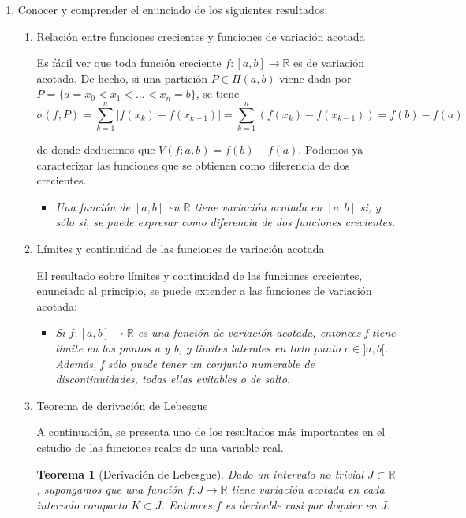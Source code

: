 \documentclass[a4paper, 12pt]{article}
\newtheorem{teorema}{Teorema}
\begin{document}
\begin{enumerate}[label=\textbf{\arabic*}.]
	\bigskip
	
	\item Conocer y comprender el enunciado de los siguientes resultados:
	
	\begin{enumerate}[label=\textit{\alph*)}]
		\item Relación entre funciones crecientes y funciones de variación acotada
		
		Es fácil ver que toda función creciente \(f: [a,b] \to \mathbb{R}\) es de variación acotada. De hecho, si una partición \(P \in \Pi (a,b)\) viene dada por \(P = \{a = x_0 < x_1 < \dotsc <  x_n = b\}\), se tiene
		\[
			\sigma (f,P) = \sum_{k=1}^{n} |f(x_k) - f(x_{k-1}) | = \sum_{k=1}^{n} (f(x_k) - f(x_{k-1})) = f(b) - f(a)
		\]
		
		de donde deducimos que \(V (f; a,b) = f(b) - f(a)\). Podemos ya caracterizar las funciones que se obtienen como diferencia de dos crecientes.
		
		\begin{itemize}
			\item \textit{Una función de \([a,b]\) en \(\mathbb{R}\) tiene variación acotada en \([a,b]\) si, y sólo si, se puede expresar como diferencia de dos funciones crecientes.}
		\end{itemize}
		
		\medskip
		
		\item Límites y continuidad de las funciones de variación acotada
		
		El resultado sobre límites y continuidad de las funciones crecientes, enunciado al principio, se puede extender a las funciones de variación acotada:
		
		\begin{itemize}
			\item \textit{Si \(f: [a,b] \to \mathbb{R}\) es una función de variación acotada, entonces f tiene límite en los puntos a y b, y límites laterales en todo punto \(c \in ]a,b[\). Además, f sólo puede tener un conjunto numerable de discontinuidades, todas ellas evitables o de salto.}
		\end{itemize}
		
		\medskip
		
		\item Teorema de derivación de Lebesgue
		
		A continuación, se presenta uno de los resultados más importantes en el estudio de las funciones reales de una variable real.
		
		\begin{teorema}[Derivación de Lebesgue]
		Dado un intervalo no trivial \(J \subset \mathbb{R}\), supongamos que una función \(f: J \to \mathbb{R}\) tiene variación acotada en cada intervalo compacto \(K \subset J\). Entonces \(f\) es derivable casi por doquier en J.
		\end{teorema}
	\end{enumerate}
\end{enumerate}
\end{document}
